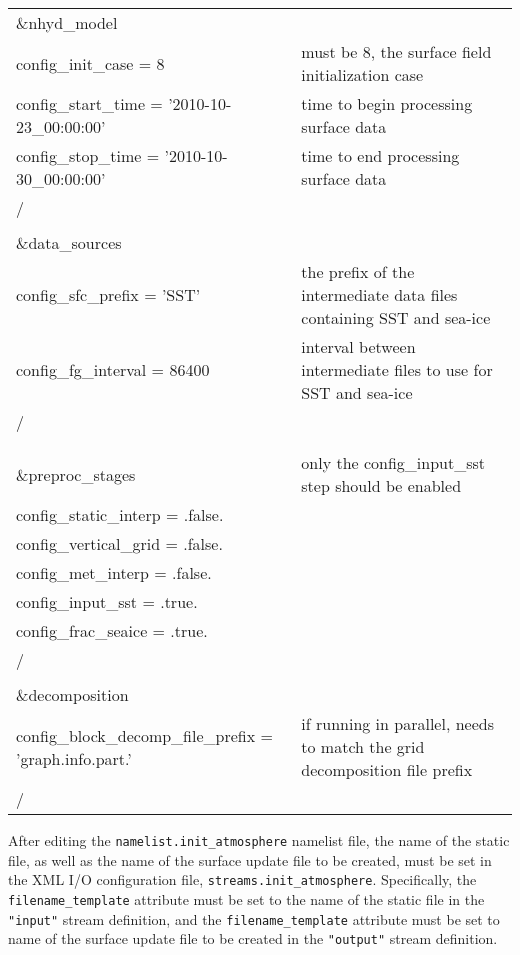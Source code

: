 \begin{longtable}{p{3.0in} |p{3.25in}}

\&nhyd\_model\\
   config\_init\_case       = 8                      & must be 8, the surface field initialization case \\
   config\_start\_time      = '2010-10-23\_00:00:00' & time to begin processing surface data \\
   config\_stop\_time       = '2010-10-30\_00:00:00' & time to end processing surface data \\
/\\
\\
\&data\_sources\\
   config\_sfc\_prefix      = 'SST'                  & the prefix of the intermediate data files containing SST and sea-ice \\
   config\_fg\_interval     = 86400                  & interval between intermediate files to use for SST and sea-ice \\
/\\
\\
\\
\&preproc\_stages                                    & only the config\_input\_sst step should be enabled \\
   config\_static\_interp   = .false.                & \\
   config\_vertical\_grid   = .false.                & \\
   config\_met\_interp      = .false.                & \\
   config\_input\_sst       = .true.                 & \\
   config\_frac\_seaice    = .true.                 & \\
/\\
\\
\&decomposition\\
   config\_block\_decomp\_file\_prefix = 'graph.info.part.' & if running in parallel, needs to match the grid decomposition file prefix \\
/\\

\end{longtable}

After editing the {\tt namelist.init\_atmosphere} namelist file, the name of the static file, as well as the name of the surface update file to be created, must be set in the XML I/O configuration file, {\tt streams.init\_atmosphere}. Specifically, the {\tt filename\_template} attribute must be set to the name of the static file in the {\tt "input"} stream definition, and the {\tt filename\_template} attribute must be set to name of the surface update file to be created in the {\tt "output"} stream definition.

